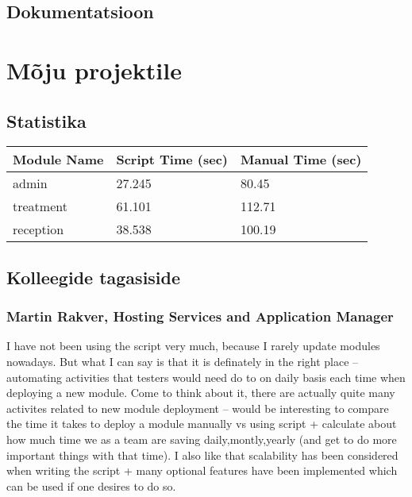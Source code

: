 \documentclass[12pt]{report}
\begin{document}
  \subsection{Dokumentatsioon}
  
  \newpage
  
  \section{Mõju projektile}
  
  \subsection{Statistika}
  
  \begin{tabular}{| l | l | l |}
    \hline
    Module Name & Script Time (sec) & Manual Time (sec)\\
    \hline
    admin & 27.245 & 80.45\\
    treatment & 61.101 & 112.71\\
    reception & 38.538 & 100.19\\
    \hline
  \end{tabular}
  
  \cite{time}

  
  \subsection{Kolleegide tagasiside}
  
  \subsubsection{Martin Rakver, Hosting Services and Application Manager}
  
  I have not been using the script very much, because I rarely update modules nowadays. But what I can say is that it is definately in the right place – automating activities that testers would need do to on daily basis each time when deploying a new module. Come to think about it, there are actually quite many activites related to new module deployment – would be interesting to compare the time it takes to deploy a module manually vs using script + calculate about how much time we as a team are saving daily,montly,yearly  (and get to do more important things with that time).
I also like that scalability has been considered when writing the script + many optional features have been implemented which can be used if one desires to do so.
\end{document}
